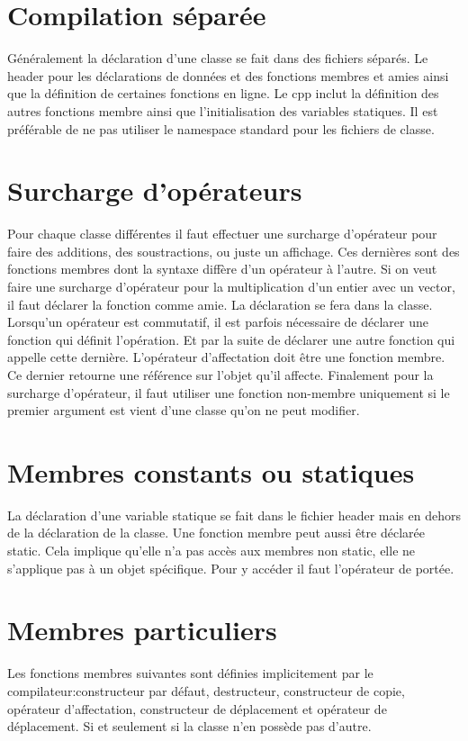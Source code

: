 \documentclass{article}
\begin{document}
\section{Compilation séparée}
Généralement la déclaration d'une classe se fait dans des fichiers séparés. Le header pour les déclarations de données et des fonctions membres et amies ainsi que la définition de certaines fonctions en ligne. Le cpp inclut la définition des autres fonctions membre ainsi que l'initialisation des variables statiques. Il est préférable de ne pas utiliser le namespace standard pour les fichiers de classe. 
\section{Surcharge d'opérateurs}
Pour chaque classe différentes il faut effectuer une surcharge d'opérateur pour faire des additions, des soustractions, ou juste un affichage. Ces dernières sont des fonctions membres dont la syntaxe diffère d'un opérateur à l'autre. Si on veut faire une surcharge d'opérateur pour la multiplication d'un entier avec un vector, il faut déclarer la fonction comme amie. La déclaration se fera dans la classe. Lorsqu'un opérateur est commutatif, il est parfois nécessaire de déclarer une fonction qui définit l'opération. Et par la suite de déclarer une autre fonction qui appelle cette dernière. 
L'opérateur d'affectation doit être une fonction membre. Ce dernier retourne une référence sur l'objet qu'il affecte. Finalement pour la surcharge d'opérateur, il faut utiliser une fonction non-membre uniquement si le premier argument est vient d'une classe qu'on ne peut modifier. 
\section{Membres constants ou statiques}
La déclaration d'une variable statique se fait dans le fichier header mais en dehors de la déclaration de la classe. Une fonction membre peut aussi être déclarée static. Cela implique qu'elle n'a pas accès aux membres non static, elle ne s'applique pas à un objet spécifique. Pour y accéder il faut l'opérateur de portée. 
\section{Membres particuliers}
Les fonctions membres suivantes sont définies implicitement par le compilateur:constructeur par défaut, destructeur, constructeur de copie, opérateur d'affectation, constructeur de déplacement et opérateur de déplacement. Si et seulement si la classe n'en possède pas d'autre. 
\end{document}
